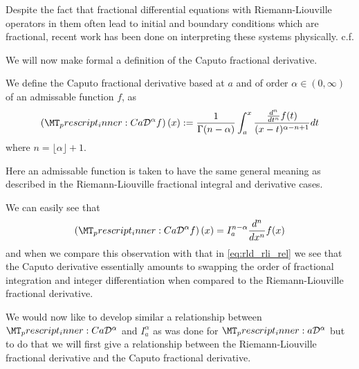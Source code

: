 Despite the fact that fractional differential equations with Riemann-Liouville operators in them often lead to initial and boundary conditions which are fractional, recent work has been done on interpreting these systems physically. c.f. \cite{Heymans2005}

We will now make formal a definition of the Caputo fractional derivative.
\begin{definition}
    We define the Caputo fractional derivative based at $ a $ and of order $\alpha \in (0, \infty) $ of an admissable function $ f $, as
    \begin{align*}
        \capder{a}{}{\alpha}{f}(x)      := \frac{1}{\Gamma(n - \alpha)} \int_a^x \frac{\frac{d^n}{dt^n}f(t)}{(x-t)^{\alpha -n + 1}} dt
    \end{align*}
    where $ n = \lfloor \alpha \rfloor + 1 $.
\end{definition}
Here an admissable function is taken to have the same general meaning as described in the Riemann-Liouville fractional integral and derivative cases.

We can easily see that
\begin{align}
    \label{eq:cap_rli_rel}
    \capder{a}{}{\alpha}{f}(x) = I_a^{n-\alpha} \frac{d^n}{dx^n} f(x)
\end{align}
and when we compare this observation with that in \eqref{eq:rld_rli_rel} we see that the Caputo derivative essentially amounts to swapping the order of fractional integration and integer differentiation when compared to the Riemann-Liouville fractional derivative.

We would now like to develop similar a relationship between $ \prescript{C}{a}{\mathcal{D}}^\alpha $ and $ I_a^\alpha $ as was done for $ \prescript{}{a}{\mathcal{D}}^\alpha $ but to do that we will first give a relationship between the Riemann-Liouville fractional derivative and the Caputo fractional derivative.

